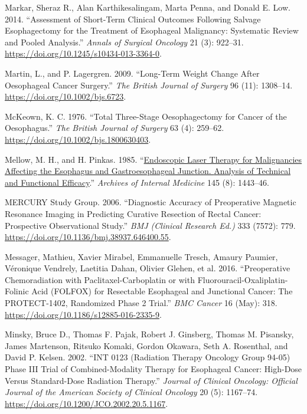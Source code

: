 \documentclass[
  letterpaper,
]{scrbook}
\newlength{\cslhangindent}
\newenvironment{CSLReferences}[2] %
 {\begin{list}{}{%
  \setlength{\itemindent}{0pt}
  \setlength{\leftmargin}{0pt}
  \setlength{\parsep}{0pt}
  \ifodd #1
   \setlength{\leftmargin}{\cslhangindent}
   \setlength{\itemindent}{-1\cslhangindent}
  \fi
  \setlength{\itemsep}{#2\baselineskip}}}
 {\end{list}}
\begin{document}
\begin{CSLReferences}{1}{0}
Markar, Sheraz R., Alan Karthikesalingam, Marta Penna, and Donald E.
Low. 2014. {``Assessment of Short-Term Clinical Outcomes Following
Salvage Esophagectomy for the Treatment of Esophageal Malignancy:
Systematic Review and Pooled Analysis.''} \emph{Annals of Surgical
Oncology} 21 (3): 922--31.
\url{https://doi.org/10.1245/s10434-013-3364-0}.

Martin, L., and P. Lagergren. 2009. {``Long-Term Weight Change After
Oesophageal Cancer Surgery.''} \emph{The British Journal of Surgery} 96
(11): 1308--14. \url{https://doi.org/10.1002/bjs.6723}.

McKeown, K. C. 1976. {``Total Three-Stage Oesophagectomy for Cancer of
the Oesophagus.''} \emph{The British Journal of Surgery} 63 (4):
259--62. \url{https://doi.org/10.1002/bjs.1800630403}.

Mellow, M. H., and H. Pinkas. 1985.
{``\href{https://www.ncbi.nlm.nih.gov/pubmed/4026476}{Endoscopic Laser
Therapy for Malignancies Affecting the Esophagus and Gastroesophageal
Junction. {Analysis} of Technical and Functional Efficacy}.''}
\emph{Archives of Internal Medicine} 145 (8): 1443--46.

MERCURY Study Group. 2006. {``Diagnostic Accuracy of Preoperative
Magnetic Resonance Imaging in Predicting Curative Resection of Rectal
Cancer: Prospective Observational Study.''} \emph{BMJ (Clinical Research
Ed.)} 333 (7572): 779.
\url{https://doi.org/10.1136/bmj.38937.646400.55}.

Messager, Mathieu, Xavier Mirabel, Emmanuelle Tresch, Amaury Paumier,
Véronique Vendrely, Laetitia Dahan, Olivier Glehen, et al. 2016.
{``Preoperative Chemoradiation with Paclitaxel-Carboplatin or with
Fluorouracil-Oxaliplatin-Folinic Acid ({FOLFOX}) for Resectable
Esophageal and Junctional Cancer: The {PROTECT}-1402, Randomized Phase 2
Trial.''} \emph{BMC Cancer} 16 (May): 318.
\url{https://doi.org/10.1186/s12885-016-2335-9}.

Minsky, Bruce D., Thomas F. Pajak, Robert J. Ginsberg, Thomas M.
Pisansky, James Martenson, Ritsuko Komaki, Gordon Okawara, Seth A.
Rosenthal, and David P. Kelsen. 2002. {``{INT} 0123 ({Radiation}
{Therapy} {Oncology} {Group} 94-05) Phase {III} Trial of
Combined-Modality Therapy for Esophageal Cancer: High-Dose Versus
Standard-Dose Radiation Therapy.''} \emph{Journal of Clinical Oncology:
Official Journal of the American Society of Clinical Oncology} 20 (5):
1167--74. \url{https://doi.org/10.1200/JCO.2002.20.5.1167}.


\end{CSLReferences}
\end{document}
